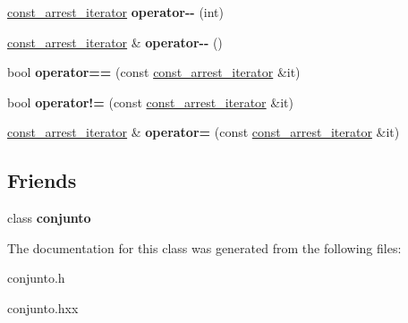 \begin{DoxyCompactItemize}
\item 
\hypertarget{classconjunto_1_1const__arrest__iterator_a5649b22cdc2a99c0045c462e276d1433}{\hyperlink{classconjunto_1_1const__arrest__iterator}{const\-\_\-arrest\-\_\-iterator} {\bfseries operator-\/-\/} (int)}\label{classconjunto_1_1const__arrest__iterator_a5649b22cdc2a99c0045c462e276d1433}

\item 
\hypertarget{classconjunto_1_1const__arrest__iterator_a12912fb9403e757a877ac5a56fdb104d}{\hyperlink{classconjunto_1_1const__arrest__iterator}{const\-\_\-arrest\-\_\-iterator} \& {\bfseries operator-\/-\/} ()}\label{classconjunto_1_1const__arrest__iterator_a12912fb9403e757a877ac5a56fdb104d}

\item 
\hypertarget{classconjunto_1_1const__arrest__iterator_a4327195351ce147dcdd578166f08c600}{bool {\bfseries operator==} (const \hyperlink{classconjunto_1_1const__arrest__iterator}{const\-\_\-arrest\-\_\-iterator} \&it)}\label{classconjunto_1_1const__arrest__iterator_a4327195351ce147dcdd578166f08c600}

\item 
\hypertarget{classconjunto_1_1const__arrest__iterator_a87c38b9da66b0c11c14b2fabc39101c2}{bool {\bfseries operator!=} (const \hyperlink{classconjunto_1_1const__arrest__iterator}{const\-\_\-arrest\-\_\-iterator} \&it)}\label{classconjunto_1_1const__arrest__iterator_a87c38b9da66b0c11c14b2fabc39101c2}

\item 
\hypertarget{classconjunto_1_1const__arrest__iterator_a4637a6035b226b75a0f706c732384aa1}{\hyperlink{classconjunto_1_1const__arrest__iterator}{const\-\_\-arrest\-\_\-iterator} \& {\bfseries operator=} (const \hyperlink{classconjunto_1_1const__arrest__iterator}{const\-\_\-arrest\-\_\-iterator} \&it)}\label{classconjunto_1_1const__arrest__iterator_a4637a6035b226b75a0f706c732384aa1}

\end{DoxyCompactItemize}
\subsection*{Friends}
\begin{DoxyCompactItemize}
\item 
\hypertarget{classconjunto_1_1const__arrest__iterator_a42fdcda39c77eabd7380e29fcdbe5dd2}{class {\bfseries conjunto}}\label{classconjunto_1_1const__arrest__iterator_a42fdcda39c77eabd7380e29fcdbe5dd2}

\end{DoxyCompactItemize}


The documentation for this class was generated from the following files\-:\begin{DoxyCompactItemize}
\item 
conjunto.\-h\item 
conjunto.\-hxx\end{DoxyCompactItemize}
